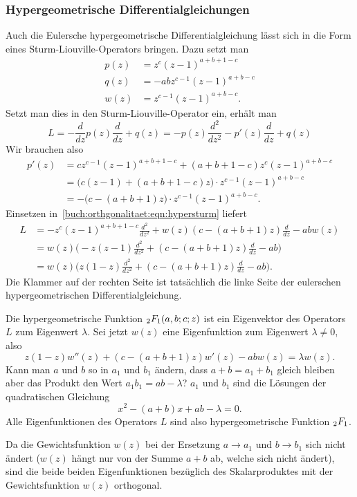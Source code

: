 \subsubsection{Hypergeometrische Differentialgleichungen}
Auch die Eulersche hypergeometrische Differentialgleichung
lässt sich in die Form eines Sturm-Liouville-Operators
bringen.
Dazu setzt man
\begin{align*}
p(z)
&=
z^c(z-1)^{a+b+1-c}
\\
q(z)
&=
-abz^{c-1}(z-1)^{a+b-c}
\\
w(z)
&=
z^{c-1}(z-1)^{a+b-c}.
\end{align*}
Setzt man dies in den Sturm-Liouville-Operator ein, erhält man
\begin{equation}
L
=
-\frac{d}{dz}p(z)\frac{d}{dz} + q(z)
=
-p(z)\frac{d^2}{dz^2}
-p'(z)\frac{d}{dz}
+q(z)
\label{buch:orthgonalitaet:eqn:hypersturm}
\end{equation}
Wir brauchen also
\begin{align*}
p'(z)
&=
cz^{c-1}(z-1)^{a+b+1-c}
+
(a+b+1-c)
z^c
(z-1)^{a+b-c}
\\
&=
\bigl(
c(z-1)+
(a+b+1-c)z
\bigr)
\cdot
z^{c-1}(z-1)^{a+b-c}
\\
&=
-
\bigl(
c-(a+b+1)z
\bigr)
\cdot
z^{c-1}(z-1)^{a+b-c}.
\end{align*}
Einsetzen in~\eqref{buch:orthgonalitaet:eqn:hypersturm} liefert
\begin{align*}
L
&=
-z^c(z-1)^{a+b+1-c} \frac{d^2}{dz^2}
+
w(z)
(c-(a+b+1)z)
\frac{d}{dz}
-
abw(z)
\\
&=
w(z)
\biggl(
-
z(z-1)
\frac{d^2}{dz^2}
+
(c-(a+b+1)z)
\frac{d}{dz}
-ab
\biggr)
\\
&=
w(z)
\biggl(
z(1-z)
\frac{d^2}{dz^2}
+
(c-(a+b+1)z)
\frac{d}{dz}
-ab
\biggr).
\end{align*}
Die Klammer auf der rechten Seite ist tatsächlich die linke Seite der
eulerschen hypergeometrischen Differentialgleichung.

Die hypergeometrische Funktion $\mathstrut_2F_1(a,b;c;z)$ ist ein
Eigenvektor des Operators $L$ zum Eigenwert $\lambda$.
Sei jetzt $w(z)$ eine Eigenfunktion zum Eigenwert $\lambda\ne 0$,
also
\[
z(1-z)w''(z) + (c-(a+b+1)z)w'(z) - ab w(z) = \lambda w(z).
\]
Kann man $a$ und $b$ so in $a_1$ und $b_1$ ändern, dass $a+b=a_1+b_1$
gleich bleiben aber das Produkt den Wert $a_1b_1=ab-\lambda$?
$a_1$ und $b_1$ sind die Lösungen der quadratischen Gleichung
\[
x^2 - (a+b)x + ab-\lambda = 0.
\]
Alle Eigenfunktionen des Operators $L$ sind also hypergeometrische
Funktion $\mathstrut_2F_1$.

Da die Gewichtsfunktion $w(z)$ bei der Ersetzung $a\to a_1$ und $b\to b_1$
sich nicht ändert ($w(z)$ hängt nur von der Summe $a+b$ ab, welche sich
nicht ändert), sind die beide beiden Eigenfunktionen bezüglich
des Skalarproduktes mit der Gewichtsfunktion $w(z)$ orthogonal.






